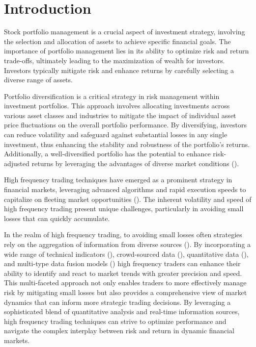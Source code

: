 \section{Introduction}
Stock portfolio management is a crucial aspect of investment strategy, involving the selection and allocation of assets to achieve specific financial goals. The importance of portfolio management lies in its ability to optimize risk and return trade-offs, ultimately leading to the maximization of wealth for investors. Investors typically mitigate risk and enhance returns by carefully selecting a diverse range of assets.

Portfolio diversification is a critical strategy in risk management within investment portfolios. This approach involves allocating investments across various asset classes and industries to mitigate the impact of individual asset price fluctuations on the overall portfolio performance. By diversifying, investors can reduce volatility and safeguard against substantial losses in any single investment, thus enhancing the stability and robustness of the portfolio's returns. Additionally, a well-diversified portfolio has the potential to enhance risk-adjusted returns by leveraging the advantages of diverse market conditions (\citet{markovitz1959portfolio}).

High frequency trading techniques have emerged as a prominent strategy in financial markets, leveraging advanced algorithms and rapid execution speeds to capitalize on fleeting market opportunities (\citet{li2014online}). The inherent volatility and speed of high frequency trading present unique challenges, particularly in avoiding small losses that can quickly accumulate. 

In the realm of high frequency trading, to avoiding small losses often strategies rely on the aggregation of information from diverse sources (\citet{thakkar2021fusion}). By incorporating a wide range of technical indicators (\citet{chen2018profitability}), crowd-sourced data (\citet{liu2023multi}), quantitative data (\citet{gomber2015high}), and multi-type data fusion models (\citet{liu2023multi}) high frequency traders can enhance their ability to identify and react to market trends with greater precision and speed. This multi-faceted approach not only enables traders to more effectively manage risk by mitigating small losses but also provides a comprehensive view of market dynamics that can inform more strategic trading decisions. By leveraging a sophisticated blend of quantitative analysis and real-time information sources, high frequency trading techniques can strive to optimize performance and navigate the complex interplay between risk and return in dynamic financial markets.

